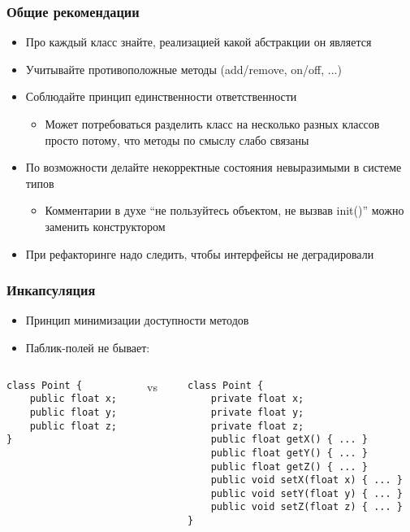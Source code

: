 \documentclass{../../slides-style}
\begin{document}
    \begin{frame}
        \frametitle{Общие рекомендации}
        \begin{itemize}
            \item Про каждый класс знайте, реализацией какой абстракции он является
            \item Учитывайте противоположные методы (add/remove, on/off, ...)
            \item Соблюдайте принцип единственности ответственности
            \begin{itemize}
                \item Может потребоваться разделить класс на несколько разных классов просто потому, что методы по смыслу слабо связаны
            \end{itemize}
            \item По возможности делайте некорректные состояния невыразимыми в системе типов
            \begin{itemize}
                \item Комментарии в духе ``не пользуйтесь объектом, не вызвав  init()'' можно заменить конструктором
            \end{itemize}
            \item При рефакторинге надо следить, чтобы интерфейсы не деградировали
        \end{itemize}
    \end{frame}

    \begin{frame}[fragile]
        \frametitle{Инкапсуляция}
        \begin{itemize}
            \item Принцип минимизации доступности методов
            \item Паблик-полей не бывает:
        \end{itemize}
        \begin{columns}
            \begin{column}{0.25\textwidth}
                \begin{verbatim}
class Point {
    public float x;
    public float y;
    public float z;
}
                \end{verbatim}
            \end{column}
            \begin{column}{0.1\textwidth}
                vs
            \end{column}
            \begin{column}{0.5\textwidth}
                \begin{verbatim}
class Point {
    private float x;
    private float y;
    private float z;
    public float getX() { ... }
    public float getY() { ... }
    public float getZ() { ... }
    public void setX(float x) { ... }
    public void setY(float y) { ... }
    public void setZ(float z) { ... }
}
                \end{verbatim}
            \end{column}
        \end{columns}
    \end{frame}
\end{document}
